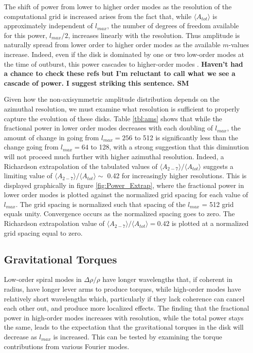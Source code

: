 \documentclass[manuscript]{aastex}
\begin{document}
The shift of power from lower to higher order modes as the resolution of the computational grid is increased arises from the fact that, while $\langle A_{tot} \rangle$ is approximately independent of $l_{max}$,  the number of degrees of freedom available for this power, $l_{max}/2$, increases linearly with the resolution. Thus amplitude is naturally spread from lower order to higher order modes as the available $m$-values increase. Indeed, even if the disk is dominated by one or two low-order modes at the time of outburst, this power cascades to higher-order modes \citep[for example][]{laughlin1997, laughlin1998,laughlin1996}. {\bf Haven't had a chance to check these refs but I'm reluctant to call what we see a cascade of power. I suggest striking this sentence. SM}


Given how the non-axisymmetric amplitude distribution depends on the azimuthal resolution, we must examine what resolution is sufficient to properly capture the evolution of these disks. Table \ref{tbl:ams} shows that while the fractional power in lower order modes decreases with each doubling of $l_{max}$, the amount of change in going from $l_{max} = 256$ to 512 
is significantly less than the change going from $l_{max} = 64$ to 128, with a strong suggestion that this diminution will not proceed much further with higher azimuthal resolution. Indeed, a  Richardson extrapolation \citep{press1992} of the tabulated values of  $\langle A_{2-7} \rangle / \langle A_{tot} \rangle$ suggests a limiting value of  $\langle A_{2-7} \rangle / \langle A_{tot} \rangle \sim$ 0.42 for increasingly higher resolutions. This is displayed graphically in figure \ref{fig:Power_Extrap}, where the fractional power in lower order modes is plotted against the  normalized grid 
spacing for each value of $l_{max}$. The grid spacing  is normalized such that spacing of the $l_{max}$ = 512 grid
equals unity.  Convergence occurs as the normalized spacing goes to zero. The Richardson extrapolation value  of $\langle A_{2-7}\rangle  / \langle A_{tot}\rangle  = 0.42$ is plotted at a normalized grid spacing  equal to zero. 

\subsection{Gravitational Torques}

Low-order spiral modes in $\Delta\rho / \rho$  have longer wavelengths that, if coherent in radius, have longer lever 
arms to produce torques, while high-order modes have relatively short wavelengths which, particularly if they 
lack coherence can cancel each other out, and produce more localized effects. 
The finding that the fractional power in high-order modes increases
with resolution, while the total power stays the same, leads to
 the expectation that the gravitational torques in the disk will decrease as $l_{max}$ is increased. This can be tested by examining the torque contributions from  various Fourier modes.
\end{document}
